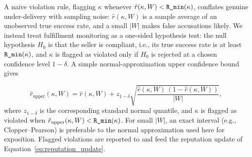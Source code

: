 A naive violation rule, flagging $\kappa$ whenever
$\hat r(\kappa, W) < \textnormal{\texttt{R\_min}}(\kappa)$, conflates genuine under-delivery
with sampling noise: $\hat r(\kappa, W)$ is a sample average of an
unobserved true success rate, and a small $|W|$ makes false accusations
likely. We instead treat fulfillment monitoring as a one-sided hypothesis
test: the null hypothesis $H_0$ is that the seller is compliant, i.e., its
true success rate is at least $\textnormal{\texttt{R\_min}}(\kappa)$, and $\kappa$ is flagged
as violated only if $H_0$ is rejected at a chosen confidence level
$1 - \delta$. A simple normal-approximation upper confidence bound gives

\begin{equation}
  \label{eq:reliability_upper_bound}
  \hat r_{\text{upper}}(\kappa, W)
  = \hat r(\kappa, W)
  + z_{1 - \delta}
    \sqrt{
      \frac{\hat r(\kappa, W) \, (1 - \hat r(\kappa, W))}{|W|}
    },
\end{equation}
where $z_{1 - \delta}$ is the corresponding standard normal quantile, and
$\kappa$ is flagged as violated when
$\hat r_{\text{upper}}(\kappa, W) < \textnormal{\texttt{R\_min}}(\kappa)$. For small $|W|$, an
exact interval (e.g., Clopper--Pearson) is preferable to the normal
approximation used here for exposition. Flagged violations are reported
to \NoesisMarket{} and feed the reputation update of
Equation~\eqref{eq:reputation_update}.

